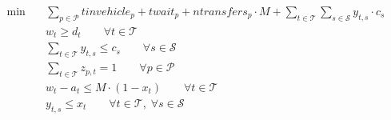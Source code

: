 \begin{align}
  \min\quad & \sum_{p \in \mathcal{P}} tinvehicle_{p} + twait_{p} + ntransfers_{p} \cdot M + \sum_{t \in \mathcal{T}} \sum_{s \in \mathcal{S}} y_{t,s} \cdot c_{s} \tag{generalized\_travel\_time} \\
  & w_{t} \ge d_{t} \qquad \forall t \in \mathcal{T} \tag{train\_dispatching} \\
  & \sum_{t \in \mathcal{T}} y_{t,s} \le c_{s} \qquad \forall s \in \mathcal{S} \tag{station\_capacity} \\
  & \sum_{t \in \mathcal{T}} z_{p,t} = 1 \qquad \forall p \in \mathcal{P} \tag{passenger\_reassignment} \\
  & w_{t} - a_{t} \le M \cdot (1 - x_{t}) \qquad \forall t \in \mathcal{T} \tag{train\_dispatching} \\
  & y_{t,s} \le x_{t} \qquad \forall t \in \mathcal{T},\; \forall s \in \mathcal{S} \tag{train\_dispatching} \\
\end{align}